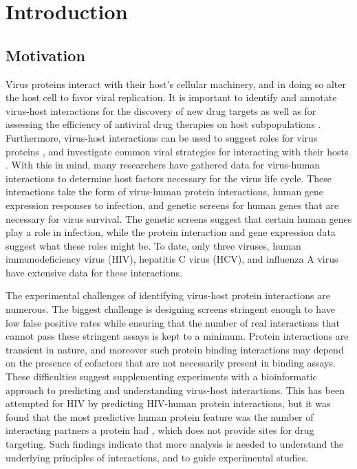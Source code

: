\chapter{Introduction} \label{chapter:prelude}

\section{Motivation}

Virus proteins interact with their host's cellular machinery, and in
doing so alter the host cell to favor viral replication. It is
important to identify and annotate virus-host interactions for the
discovery of new drug targets as well as for assessing the efficiency
of antiviral drug therapies on host subpopulations
\cite{brass08,dampier09}. Furthermore, virus-host interactions can be
used to suggest roles for virus proteins \cite{calderwood07}, and
investigate common viral strategies for interacting with their hosts
\cite{navratil-system}. With this in mind, many researchers have
gathered data for virus-human interactions to determine host factors
necessary for the virus life cycle. These interactions take the form
of virus-human protein interactions, human gene expression responses
to infection, and genetic screens for human genes that are necessary
for virus survival. The genetic screens suggest that certain human
genes play a role in infection, while the protein interaction and gene
expression data suggest what these roles might be. To date, only three
viruses, human immunodeficiency virus (HIV), hepatitis C virus (HCV),
and influenza A virus have extensive data for these interactions.

The experimental challenges of identifying virus-host protein
interactions are numerous. The biggest challenge is designing screens
stringent enough to have low false positive rates while ensuring that
the number of real interactions that cannot pass these stringent
assays is kept to a minimum. Protein interactions are transient in
nature, and moreover such protein binding interactions may depend on
the presence of cofactors that are not necessarily present in binding
assays. These difficulties suggest supplementing experiments with a
bioinformatic approach to predicting and understanding virus-host
interactions. This has been attempted for HIV by predicting HIV-human
protein interactions, but it was found that the most predictive human
protein feature was the number of interacting partners a protein had
\cite{tastan09}, which does not provide sites for drug targeting. Such
findings indicate that more analysis is needed to understand the
underlying principles of interactions, and to guide experimental
studies.

